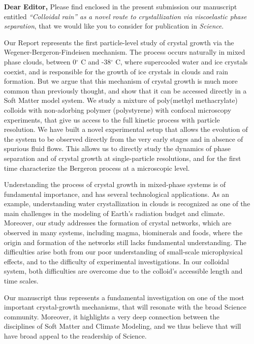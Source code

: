 \documentclass[11pt]{article}
\begin{document}
\doublespacing

\noindent
{\bf Dear Editor,}
\vskip 0.3cm
Please find enclosed in the present submission our manuscript entitled
\emph{``Colloidal rain'' as a novel route to crystallization via viscoelastic phase separation},
that we would like you to consider for publication in \emph{Science}.

Our Report represents the first particle-level study of crystal growth via the Wegener-Bergeron-Findeisen mechanism.
The process occurs naturally in mixed phase clouds, between 0$^\circ$ C and -38$^\circ$ C, where supercooled water and ice crystals coexist,
and is responsible for the growth of ice crystals in clouds and rain formation. But we argue that this
mechanism of crystal growth is much more common than previously thought,
and show that it can be accessed directly in a Soft Matter model system.
We study a mixture of poly(methyl methacrylate) colloids with non-adorbing polymer (polystyrene)
with confocal microscopy experiments, that give us access to the full kinetic process with
particle resolution. We have built a novel experimental setup that allows the evolution of
the system to be observed directly from the very early stages and in absence of spurious fluid flows.
This allows us to directly study the dynamics of phase separation and of crystal growth at single-particle resolutions,
and for the first time characterize the Bergeron process at a microscopic level.

Understanding the process of crystal growth in mixed-phase systems is of fundamental importance,
and has several technological applications. As an example, understanding
water crystallization in clouds is recognized as one of the main challenges in the
modeling of Earth's radiation budget and climate. Moreover, our study addresses the formation of crystal networks,
which are observed in many systems, including magma, biominerals and foods, where the origin
and formation of the networks still lacks fundamental understanding. 
The difficulties arise both from our poor understanding of small-scale microphysical effects,
and to the difficulty of experimental investigations. In our colloidal system, both
difficulties are overcome due to the colloid's accessible length and time scales.

Our manuscript thus represents a fundamental investigation on one of the most important
crystal-growth mechanisms, that will resonate with the broad Science community.
Moreover, it highlights a very deep connection between the disciplines of Soft Matter and Climate Modeling,
and we thus believe that will have broad appeal to the readership of Science.
\end{document}

